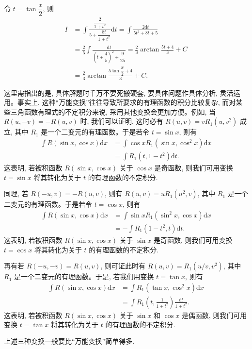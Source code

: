 \begin{solve}
令 $t=\tan\dfrac x2$, 则
\[
\begin{aligned}
  I
  &=
  \int\frac{\dfrac2{1+t^2}}{5+\dfrac{8t}{1+t^2}}\mathrm dt
  =
  \int\frac{2\mathrm dt}{5t^2+8t+5}\\
  &=
  \frac25\int\frac{\mathrm dt}{\left(t+\dfrac45\right)^2+\dfrac9{25}}
  =
  \frac23\arctan\frac{5t+4}3+C\\
  &=
  \frac23\arctan\frac{5\tan\dfrac x2+4}3+C.
\end{aligned}
\]

这里需指出的是, 具体解题时千万不要死搬硬套, 要具体问题作具体分析, 灵活运用。事实上, 这种``万能变换''往往导致所要求的有理函数的积分比较复杂, 而对某些三角函数有理式的不定积分来说, 采用其他变换会更加方便。例如, 当 $R(u,-v)=-R(u,v)$ 时, 我们可以证明, 这时必有 $R(u,v)=vR_1(u,v^2)$ 成立, 其中 $R_1$ 是一个二变元的有理函数。于是若令 $t=\sin x$, 则有
\[
\begin{aligned}
  \int R(\sin x,\cos x)\mathrm dx
  &=
  \int\cos xR_1(\sin x,\cos^2x)\mathrm dx\\
  &=
  \int R_1(t,1-t^2)\mathrm dt.
\end{aligned}
\]
这表明, 若被积函数 $R(\sin x,\cos x)$ 关于 $\cos x$ 是奇函数, 则我们可用变换 $t=\sin x$ 将其转化为关于 $t$ 的有理函数的不定积分.

同理, 若 $R(-u,v)=-R(u,v)$, 则有 $R(u,v)=uR_1(u^2,v)$, 其中 $R_1$ 是一个二变元的有理函数。于是若令 $t=\cos x$, 则有
\[
\begin{aligned}
  \int R(\sin x,\cos x)\mathrm dx
  &=
  \int\sin xR_1(\sin^2x,\cos x)\mathrm dx\\
  &=
  -\int R_1(1-t^2,t)\mathrm dt.
\end{aligned}
\]
这表明, 若被积函数 $R(\sin x,\cos x)$ 关于 $\sin x$ 是奇函数, 则我们可用变换 $t=\cos x$ 将其转化为关于 $t$ 的有理函数的不定积分.

再有若 $R(-u,-v)=R(u,v)$, 则可证此时有 $R(u,v)=R_1(u/v,v^2)$, 其中 $R_1$ 是一个二变元的有理函数。于是, 若我们用变换 $t=\tan x$, 则有
\[
\begin{aligned}
  \int R(\sin x,\cos x)\mathrm dx
  &=
  \int R_1(\tan x,\cos^2x)\mathrm dx\\
  &=
  \int R_1\left(t,\frac1{1+t^2}\right)\frac{\mathrm dt}{1+t^2}.
\end{aligned}
\]
这表明, 若被积函数 $R(\sin x,\cos x)$ 关于 $\sin x$ 和 $\cos x$ 是偶函数, 则我们可用变换 $t=\tan x$ 将其转化为关于 $t$ 的有理函数的不定积分.

上述三种变换一般要比``万能变换''简单得多.
\end{solve}


